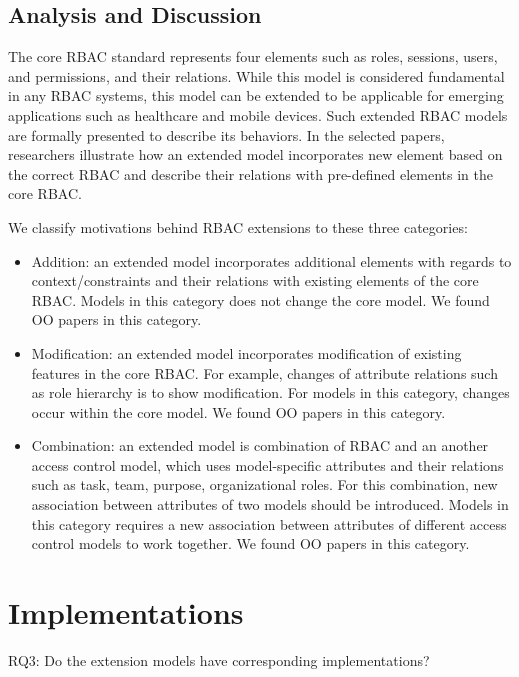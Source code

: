\subsection{Analysis and Discussion}

The core RBAC standard represents four elements such as roles, sessions, users, and permissions, and their relations. While this model is considered fundamental in any RBAC systems, this model can be extended to be applicable for emerging applications such as healthcare and mobile devices. Such extended RBAC models are formally presented to describe its behaviors. In the selected papers, researchers illustrate how an extended model incorporates new element based on the correct RBAC and describe their relations with pre-defined elements in the core RBAC.

We classify motivations behind RBAC extensions to these three categories:

\begin{itemize}
	\item Addition: an extended model incorporates additional elements with regards to context/constraints and their relations with existing elements of the core RBAC. Models in this category does not change the core model. We found OO papers in this category.
	\item Modification:  an extended model incorporates modification of existing features in the core RBAC. For example, changes of attribute relations such as role hierarchy is to show modification. For models in this category, changes occur within the core model. We found OO papers in this category.
	\item Combination: an extended model is combination of RBAC and an another access control model, which uses model-specific attributes and their relations such as task, team, purpose, organizational roles. For this combination, new association between attributes of two models should be introduced. Models in this category requires a new association between attributes of different access control models to work together. We found OO papers in this category.
\end{itemize}

\section{Implementations} \label{sec:implementations}

RQ3: Do the extension models have corresponding implementations?

